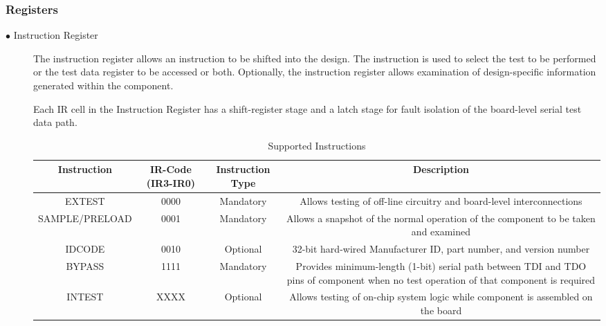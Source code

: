 \documentclass[a4paper,11pt]{article}
\begin{document}
\subsubsection{Registers}
\begin{description}
\item [$\bullet$ Instruction Register]
The instruction register allows an instruction to be shifted into the design. The instruction is used to select the test to be performed or the test data register to be accessed or both. Optionally, the instruction register allows examination of design-specific information generated within the component.

Each IR cell in the Instruction Register has a shift-register stage and a latch stage for fault isolation of the board-level serial test data path.


\begin{center}
\begin{table}[!h]
\caption{Supported Instructions}
\label{table:IR}
\begin{tabular}{|c|c|c|c|}
 \hline
 \textbf{Instruction} & \multicolumn{1}{m{2cm}|}{\textbf{IR-Code (IR3-IR0)}} & \multicolumn{1}{m{2cm}|}{\textbf{Instruction Type}} & \textbf{Description} \\ \hline
 
 EXTEST & 0000 & Mandatory & \multicolumn{1}{m{7cm}|}{Allows testing of off-line circuitry and board-level interconnections}\\\hline
 
 SAMPLE/PRELOAD & 0001 & Mandatory & \multicolumn{1}{m{7cm}|}{Allows a snapshot of the normal operation of the component to be taken and examined}\\\hline

 IDCODE & 0010 & Optional & \multicolumn{1}{m{7cm}|}{32-bit hard-wired Manufacturer ID, part number, and version number}\\\hline

BYPASS & 1111 & Mandatory & \multicolumn{1}{m{7cm}|}{Provides minimum-length (1-bit) serial path between TDI and TDO pins of component when no test operation of that component is required}\\\hline

 INTEST & XXXX & Optional & \multicolumn{1}{m{7cm}|}{Allows testing of on-chip system logic while component is assembled on the board}\\\hline 


\end{tabular}
\end{table}
\end{center}
\end{description}
\end{document}

